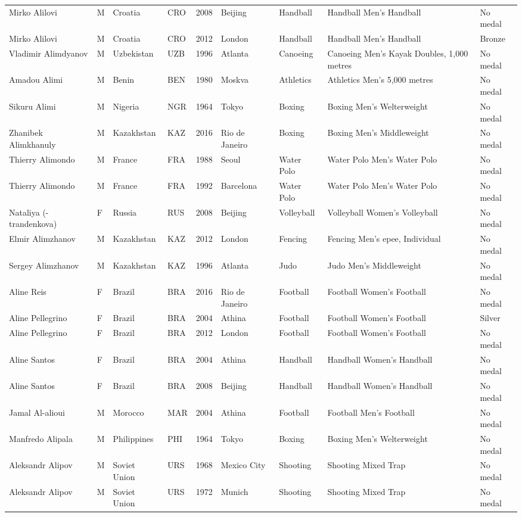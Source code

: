 \documentclass{article}%
\begin{document}
\begin{longtable}{l l l l l l l l l}
Mirko Alilovi&M&Croatia&CRO&2008&Beijing&Handball&Handball Men's Handball&No medal\\%
Mirko Alilovi&M&Croatia&CRO&2012&London&Handball&Handball Men's Handball&Bronze\\%
Vladimir Alimdyanov&M&Uzbekistan&UZB&1996&Atlanta&Canoeing&Canoeing Men's Kayak Doubles, 1,000 metres&No medal\\%
Amadou Alimi&M&Benin&BEN&1980&Moskva&Athletics&Athletics Men's 5,000 metres&No medal\\%
Sikuru Alimi&M&Nigeria&NGR&1964&Tokyo&Boxing&Boxing Men's Welterweight&No medal\\%
Zhanibek Alimkhanuly&M&Kazakhstan&KAZ&2016&Rio de Janeiro&Boxing&Boxing Men's Middleweight&No medal\\%
Thierry Alimondo&M&France&FRA&1988&Seoul&Water Polo&Water Polo Men's Water Polo&No medal\\%
Thierry Alimondo&M&France&FRA&1992&Barcelona&Water Polo&Water Polo Men's Water Polo&No medal\\%
Nataliya ({-}trandenkova)&F&Russia&RUS&2008&Beijing&Volleyball&Volleyball Women's Volleyball&No medal\\%
Elmir Alimzhanov&M&Kazakhstan&KAZ&2012&London&Fencing&Fencing Men's epee, Individual&No medal\\%
Sergey Alimzhanov&M&Kazakhstan&KAZ&1996&Atlanta&Judo&Judo Men's Middleweight&No medal\\%
Aline Reis&F&Brazil&BRA&2016&Rio de Janeiro&Football&Football Women's Football&No medal\\%
Aline Pellegrino&F&Brazil&BRA&2004&Athina&Football&Football Women's Football&Silver\\%
Aline Pellegrino&F&Brazil&BRA&2012&London&Football&Football Women's Football&No medal\\%
Aline Santos&F&Brazil&BRA&2004&Athina&Handball&Handball Women's Handball&No medal\\%
Aline Santos&F&Brazil&BRA&2008&Beijing&Handball&Handball Women's Handball&No medal\\%
Jamal Al{-}alioui&M&Morocco&MAR&2004&Athina&Football&Football Men's Football&No medal\\%
Manfredo Alipala&M&Philippines&PHI&1964&Tokyo&Boxing&Boxing Men's Welterweight&No medal\\%
Aleksandr Alipov&M&Soviet Union&URS&1968&Mexico City&Shooting&Shooting Mixed Trap&No medal\\%
Aleksandr Alipov&M&Soviet Union&URS&1972&Munich&Shooting&Shooting Mixed Trap&No medal\\%

\end{longtable}
\end{document}
